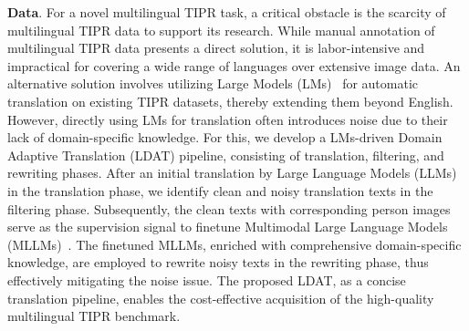 \documentclass[10pt,journal,compsoc]{IEEEtran}
\begin{document}
\textbf{Data}. For a novel multilingual TIPR task, a critical obstacle is the scarcity of multilingual TIPR data to support its research. While manual annotation of multilingual TIPR data presents a direct solution, it is labor-intensive and impractical for covering a wide range of languages over extensive image data. 
An alternative solution involves utilizing Large Models (LMs)~\cite{dubey2024llama, ouyang2022training, bai2023qwenvl, abdin2024phi, zhu2023minigpt, liu2024visual} for automatic translation on existing TIPR datasets, thereby extending them beyond English. 
However, directly using LMs for translation often introduces noise due to their lack of domain-specific knowledge. For this, we develop a LMs-driven Domain Adaptive Translation (LDAT) pipeline, consisting of translation, filtering, and rewriting phases. After an initial translation by Large Language Models (LLMs)~\cite{bai2023qwen, dubey2024llama, ouyang2022training} in the translation phase, we identify clean and noisy translation texts in the filtering phase. Subsequently, the clean texts with corresponding person images serve as the supervision signal to finetune Multimodal Large Language Models (MLLMs)~\cite{bai2023qwenvl, abdin2024phi, zhu2023minigpt}. The finetuned MLLMs, enriched with comprehensive domain-specific knowledge, are employed to rewrite noisy texts in the rewriting phase, thus effectively mitigating the noise issue. The proposed LDAT, as a concise translation pipeline, enables the cost-effective acquisition of the high-quality multilingual TIPR benchmark.
\end{document}
